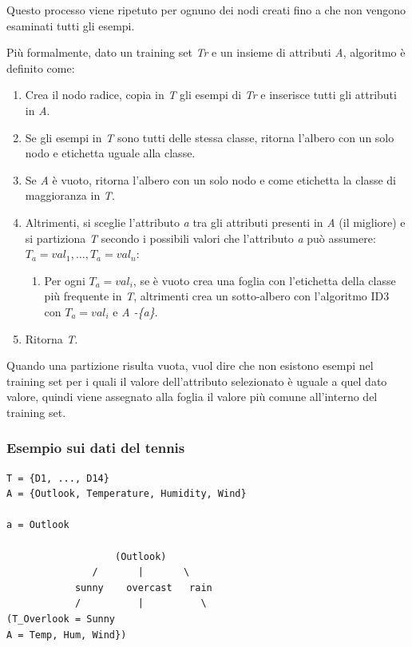 Questo processo viene ripetuto per ognuno dei nodi creati fino a che
non vengono esaminati tutti gli esempi.

Più formalmente, dato un training set \emph{Tr} e un insieme di
attributi \emph{A}, algoritmo è definito come:

\begin{enumerate}
\item
  Crea il nodo radice, copia in \emph{T} gli esempi di \emph{Tr} e
  inserisce tutti gli attributi in \emph{A}.
\item
  Se gli esempi in \emph{T} sono tutti delle stessa classe, ritorna
  l'albero con un solo nodo e etichetta uguale alla classe.
\item
  Se \emph{A} è vuoto, ritorna l'albero con un solo nodo e come
  etichetta la classe di maggioranza in \emph{T}.
\item
  Altrimenti, si sceglie l'attributo \emph{a} tra gli attributi presenti
  in \emph{A} (il migliore) e si partiziona \emph{T} secondo i possibili
  valori che l'attributo \emph{a} può assumere: $T_a = val_1, \ldots,  T_a = val_n$:
 \begin{enumerate}
  \item
    Per ogni $T_a = val_i$, se è vuoto crea una foglia con
    l'etichetta della classe più frequente in \emph{T}, altrimenti crea un
    sotto-albero con l'algoritmo ID3 con $T_a = val_i$ e \emph{A -\{}\textit{a}\emph{\}}.
  \end{enumerate}
\item
  Ritorna \emph{T}.
\end{enumerate}

Quando una partizione risulta vuota, vuol dire che non esistono esempi
nel training set per i quali il valore dell'attributo selezionato è
uguale a quel dato valore, quindi viene assegnato alla foglia il valore più comune all'interno del training set.

\subsubsection{Esempio sui dati del tennis}\label{esempio-sui-dati-del-tennis}

\begin{verbatim}
T = {D1, ..., D14}
A = {Outlook, Temperature, Humidity, Wind}

a = Outlook

                   (Outlook)
               /       |       \
            sunny    overcast   rain
            /          |          \
(T_Overlook = Sunny
A = Temp, Hum, Wind})
\end{verbatim}

